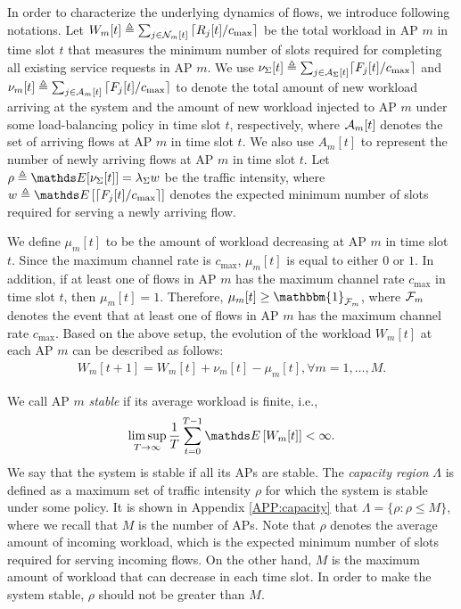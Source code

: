 \documentclass[10pt, conference, letterpaper]{IEEEtran} %
\begin{document}
In order to characterize the underlying dynamics of flows, we introduce following notations. Let $W_m[t]\triangleq\sum_{j\in\mathcal{N}_{m}[t]}\left\lceil R_j[t]/c_{\max}\right\rceil$ be the total workload in AP $m$ in time slot $t$ that measures the minimum number of slots required for completing all existing service requests in AP $m$. We use $\nu_{\Sigma}[t]\triangleq\sum_{j\in\mathcal{A}_{\Sigma}[t]}\lceil F_j[t]/c_{\max}\rceil$ and $\nu_{m}[t]\triangleq\sum_{j\in\mathcal{A}_{m}[t]}\left\lceil F_j[t]/c_{\max}\right\rceil$ to denote the total amount of new workload arriving at the system and the amount of new workload injected to AP $m$ under some load-balancing policy in time slot $t$, respectively, where $\mathcal{A}_{m}[t]$ denotes the set of arriving flows at AP $m$ in time slot $t$. We also use $A_m[t]$ to represent the number of newly arriving flows at AP $m$ in time slot $t$. Let $\rho\triangleq\bE[\nu_{\Sigma}[t]]=\lambda_{\Sigma}w$ be the traffic intensity, where $w\triangleq\bE\left[\lceil F_j[t]/c_{\max}\rceil\right]$ denotes the expected minimum number of slots required for serving a newly arriving flow.

We define $\mu_m[t]$ to be the amount of workload decreasing at AP $m$ in time slot $t$. Since the maximum channel rate is $c_{\max}$, $\mu_{m}[t]$ is equal to either $0$ or $1$. In addition, if at least one of flows in AP $m$ has the maximum channel rate $c_{\max}$ in time slot $t$, then $\mu_m[t]=1$. Therefore, $\mu_{m}[t]\geq\mathbbm{1}_{\mc{F}_m}$, where $\mathcal{F}_m$ denotes the event that at least one of flows in AP $m$ has the maximum channel rate $c_{\max}$. Based on the above setup, the evolution of the workload $W_m[t]$ at each AP $m$ can be described as follows:
\begin{align}
\label{eqn:dynamic:workload}
W_m[t+1] = W_m[t] + \nu_m[t] - \mu_m[t], \forall m=1,\ldots,M.
\end{align}


We call AP $m$ \emph{stable} if its average workload is finite, i.e., 
\begin{align*}
\limsup_{T\rightarrow\infty}\frac{1}{T}\sum_{t=0}^{T-1}\bE\left[W_{m}[t]\right]<\infty.
\end{align*}
We say that the system is stable if all its APs are stable. The \emph{capacity region} $\Lambda$ is defined as a maximum set of traffic intensity $\rho$ for which the system is stable under some policy. It is shown in Appendix \ref{APP:capacity} that $\Lambda=\{\rho: \rho\leq M\}$, where we recall that $M$ is the number of APs. Note that $\rho$ denotes the average amount of incoming workload, which is the expected minimum number of slots required for serving incoming flows. On the other hand, $M$ is the maximum amount of workload that can decrease in each time slot. In order to make the system stable, $\rho$ should not be greater than $M$.
\end{document}

